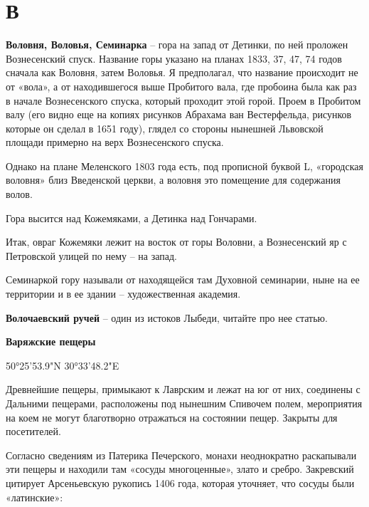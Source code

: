 \chapter*{В}

\textbf{Воловня, Воловья, Семинарка} – гора на запад от Детинки, по ней проложен Вознесенский спуск. Название горы указано на планах 1833, 37, 47, 74 годов сначала как Воловня, затем Воловья. Я предполагал, что название происходит не от «вола», а от находившегося выше Пробитого вала, где пробоина была как раз в начале Вознесенского спуска, который проходит этой горой. Проем в Пробитом валу (его видно еще на копиях рисунков Абрахама ван Вестерфельда, рисунков которые он сделал в 1651 году), глядел со стороны нынешней Львовской площади примерно на верх Вознесенского спуска. 

Однако на плане Меленского 1803 года есть, под прописной буквой L, «городская воловня» близ Введенской церкви, а воловня это помещение для содержания волов. 

Гора высится над Кожемяками, а Детинка над Гончарами. 

Итак, овраг Кожемяки лежит на восток от горы Воловни, а Вознесенский яр с Петровской улицей по нему – на запад.

Семинаркой гору называли от находящейся там Духовной семинарии, ныне на ее территории и в ее здании – художественная академия.\\

\medskip

\textbf{Волочаевский ручей} – один из истоков Лыбеди, читайте про нее статью.\\



\medskip


\textbf{Варяжские пещеры}

50°25'53.9"N 30°33'48.2"E

Древнейшие пещеры, примыкают к Лаврским и лежат на юг от них, соединены с Дальними пещерами, расположены под нынешним Спивочем полем, мероприятия на коем не могут благотворно отражаться на состоянии пещер. Закрыты для посетителей.

Согласно сведениям из Патерика Печерского, монахи неоднократно раскапывали эти пещеры и находили там «сосуды многоценные», злато и сребро. Закревский цитирует Арсеньевскую рукопись 1406 года, которая уточняет, что сосуды были «латинские»:

